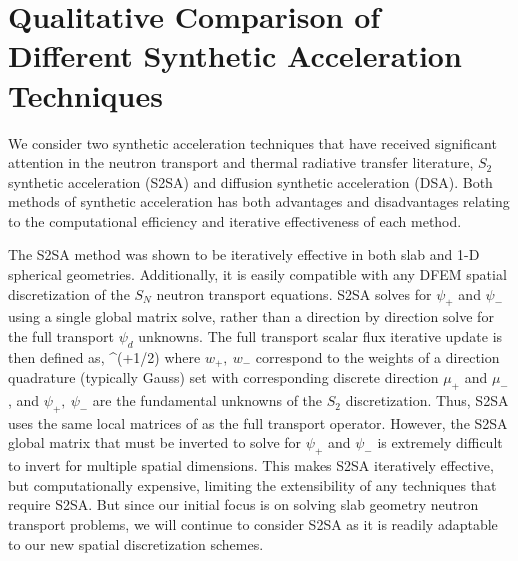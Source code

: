 \section{Qualitative Comparison of Different Synthetic Acceleration Techniques}
\label{sec:synthetics}

We consider two synthetic acceleration techniques that have received significant attention in the neutron transport and thermal radiative transfer literature,
$S_2$ synthetic acceleration (S2SA)\cite{s2sa} and diffusion synthetic acceleration (DSA)\cite{old_dsa}.
Both methods of synthetic acceleration has both advantages and disadvantages relating to the computational efficiency and iterative effectiveness of each method.  

The S2SA method was shown to be iteratively effective in both slab and 1-D spherical geometries. 
Additionally, it is easily compatible with any DFEM spatial discretization of the $S_N$ neutron transport equations.  
S2SA solves for $\psi_+$ and $\psi_-$ using a single global matrix solve, rather than a direction by direction solve for the full transport $\psi_d$ unknowns.
The full transport scalar flux iterative update is then defined as,
\benum
\Delta \phi^{(\ell+1/2)} \pi {} \pec
\eenum
where $w_+,~w_-$ correspond to the weights of a direction quadrature (typically Gauss) set with corresponding discrete direction $\mu_+$ and $\mu_-$, and $\psi_+,~\psi_-$ are the fundamental unknowns of the $S_2$ discretization.
Thus, S2SA uses the same local matrices of  as the full transport operator.
However, the S2SA global matrix that must be inverted to solve for $\psi_+$ and $\psi_-$ is extremely difficult to invert for multiple spatial dimensions.
This makes S2SA iteratively effective, but computationally expensive, limiting the extensibility of any techniques that require S2SA.
But since our initial focus is on solving slab geometry neutron transport problems, we will continue to consider S2SA as it is readily adaptable to our new spatial discretization schemes. \cite{s2sa}

